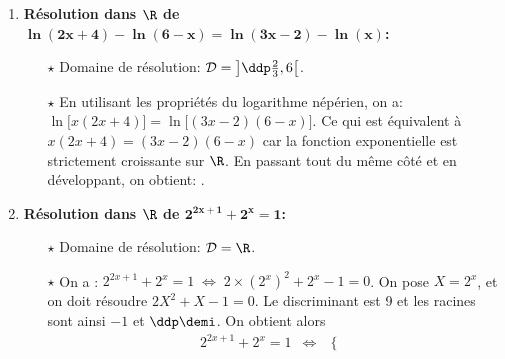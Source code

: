 \begin{correction}
\begin{enumerate}
\begin{itemize}
\end{itemize}
\item \textbf{R\'esolution dans $\mathbf{\R}$ de $\mathbf{\ln{(2x+4)} -\ln{(6-x)}=\ln{(3x-2)}-\ln{(x)}}$:}\\
\noindent \begin{itemize}
\item[$\star$] Domaine de r\'esolution: $\mathcal{D}=\left\rbrack \ddp\frac{2}{3},6\right\lbrack$.
\item[$\star$] En utilisant les propri\'et\'es du logarithme n\'ep\'erien, on a: $\ln{\lbrack x(2x+4)\rbrack}=\ln{\lbrack (3x-2)(6-x)\rbrack}$. Ce qui est \'equivalent \`{a} $x(2x+4)=(3x-2)(6-x)$ car la fonction exponentielle est strictement croissante sur $\R$. En passant tout du m\^{e}me c\^{o}t\'e et en d\'eveloppant, on obtient: .
\end{itemize} 
\item \textbf{R\'esolution dans $\mathbf{\R}$ de $\mathbf{2^{2x+1}+2^x=1}$:}\\
\noindent \begin{itemize}
\item[$\star$] Domaine de r\'esolution: $\mathcal{D}=\R$.
\item[$\star$] 
On a  :  $2^{2x+1}+2^x=1  \; \Leftrightarrow \; 2\times (2^x)^2+2^x-1=0$. On pose $X=2^x$, et on doit r\'esoudre $2X^2+X-1=0.$
Le discriminant est 9 et les racines sont ainsi $-1$ et $\ddp\demi$.
On obtient alors 
$$\begin{array}{llll}
2^{2x+1}+2^x=1& \Leftrightarrow &\left\lbrace\begin{array}{lll}

\end{array}
\end{array}$$
\end{itemize}
\end{enumerate}
\end{correction}
